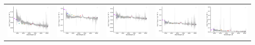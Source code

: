 \begin{center}
\begin{longtable}{l l l l l }
    \includegraphics[width=0.19\linewidth, clip]{Figs/Figs-sdss/spec-0701-52179-0153-STRIPE82-0045-050333.pdf} & \includegraphics[width=0.19\linewidth, clip]{Figs/Figs-sdss/spec-0702-52178-0098-STRIPE82-0047-013896.pdf} & \includegraphics[width=0.19\linewidth, clip]{Figs/Figs-sdss/spec-0702-52178-0126-STRIPE82-0047-015137.pdf} & \includegraphics[width=0.19\linewidth, clip]{Figs/Figs-sdss/spec-0703-52209-0097-STRIPE82-0049-015869.pdf} & \includegraphics[width=0.19\linewidth, clip]{Figs/Figs-sdss/spec-0707-52177-0374-STRIPE82-0060-019709.pdf} \\

\end{longtable}
\end{center}

